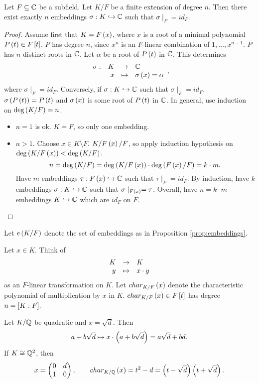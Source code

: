 \begin{proposition}
\label{prop:embeddings}
Let $ F \subseteq \C $ be a subfield. Let $ K / F $ be a finite extension of degree $ n $. Then there exist exactly $ n $ embeddings $ \sigma : K \hookrightarrow \C $ such that $ \sigma \mid_F = id_F $.
\end{proposition}

\begin{proof}
Assume first that $ K = F\rb{x} $, where $ x $ is a root of a minimal polynomial $ P\rb{t} \in F\sb{t} $. $ P $ has degree $ n $, since $ x^n $ is an $ F $-linear combination of $ 1, \dots, x^{n - 1} $. $ P $ has $ n $ distinct roots in $ \C $. Let $ \alpha $ be a root of $ P\rb{t} $ in $ \C $. This determines
$$ \function[\sigma]{K}{\C}{x}{\sigma\rb{x} = \alpha}, $$
where $ \sigma \mid_F = id_F $. Conversely, if $ \sigma : K \hookrightarrow \C $ such that $ \sigma \mid_F = id_F $, $ \sigma\rb{P\rb{t}} = P\rb{t} $ and $ \sigma\rb{x} $ is some root of $ P\rb{t} $ in $ \C $. In general, use induction on $ \deg\rb{K / F} = n $.
\begin{itemize}
\item $ n = 1 $ is ok. $ K = F $, so only one embedding.
\item $ n > 1 $. Choose $ x \in K \setminus F $. $ K / F\rb{x} / F $, so apply induction hypothesis on $ \deg\rb{K / F\rb{x}} < \deg\rb{K / F} $.
$$ n = \deg\rb{K / F} = \deg\rb{K / F\rb{x}} \cdot \deg\rb{F\rb{x} / F} = k \cdot m. $$
Have $ m $ embeddings $ \tau : F\rb{x} \hookrightarrow \C $ such that $ \tau \mid_F = id_F $. By induction, have $ k $ embeddings $ \sigma : K \hookrightarrow \C $ such that $ \sigma \mid_{F\rb{x}} = \tau $. Overall, have $ n = k \cdot m $ embeddings $ K \hookrightarrow \C $ which are $ id_F $ on $ F $.
\end{itemize}
\end{proof}

\begin{notation*}
Let $ e\rb{K / F} $ denote the set of embeddings as in Proposition \ref{prop:embeddings}.
\end{notation*}

Let $ x \in K $. Think of
$$ \function{K}{K}{y}{x \cdot y} $$
as an $ F $-linear transformation on $ K $. Let $ char_{K / F}\rb{x} $ denote the characteristic polynomial of multiplication by $ x $ in $ K $. $ char_{K / F}\rb{x} \in F\sb{t} $ has degree $ n = \sb{K : F} $.

\begin{example*}
Let $ K / \Q $ be quadratic and $ x = \sqrt{d} $. Then
$$ a + b\sqrt{d} \mapsto x \cdot \rb{a + b\sqrt{d}} = a\sqrt{d} + bd. $$
If $ K \cong \Q^2 $, then
$$ x = \twobytwo{0}{d}{1}{0}, \qquad char_{K / \Q}\rb{x} = t^2 - d = \rb{t - \sqrt{d}}\rb{t + \sqrt{d}}. $$
\end{example*}

